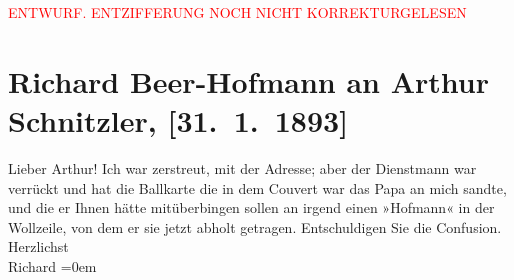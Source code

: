 
\begin{center}
            \textcolor{red}{ENTWURF. ENTZIFFERUNG NOCH NICHT KORREKTURGELESEN}
                      \end{center}
            
               \section[Richard Beer-Hofmann an Arthur Schnitzler, {[}31. 1. 1893{]}]{ Richard Beer-Hofmann an Arthur Schnitzler, {[}31. 1. 1893{]}}\nopagebreak{}\rehead{ }\begin{ledgroupsized}[t]{13cm}\normalsize\beginnumbering{} \toendnotes[C]{\smallbreak\pagebreak[2]} 
\toendnotes[C]{\smallbreak}\pstart{}{\pb}Lieber Arthur!\pend\pstart
           Ich war zerstreut, mit der Adresse; aber der Dienstmann war verrückt und hat die
               Ballkarte die in dem Couvert war das Papa an
               mich sandte, und die er Ihnen hätte mitüberbingen sollen {\pb}an irgend einen »Hofmann« in der
                  Wollzeile, 
               von dem er sie jetzt abholt getragen. Entschuldigen Sie die Confusion.\pend
           \pstart
           Herzlichst{\\[\baselineskip]}\spacefill\mbox{Richard}\pend
           \leftskip=0em{}\endnumbering{}\end{ledgroupsized}  \newcommand{\dateiname}{L00168}\newcommand{\titel}{Richard Beer-Hofmann an Arthur Schnitzler, [31. 1. 1893]}\newcommand{\editorInnen}{Martin Anton Müller und Gerd-Hermann Susen}
      
